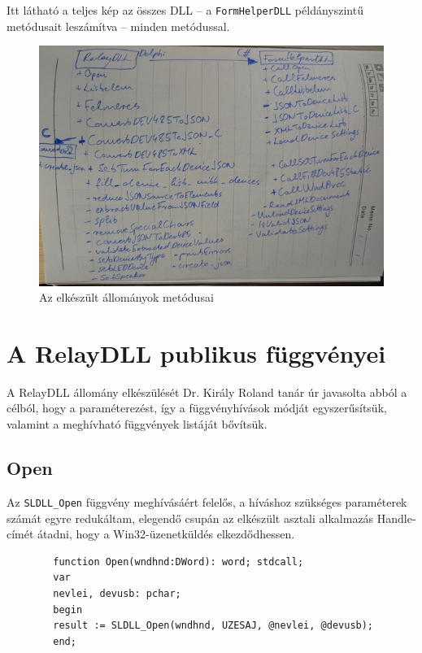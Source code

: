 \documentclass[tocnopagenum]{thesis-ekf}
\begin{document}
	Itt látható a teljes kép az összes DLL -- a \verb*|FormHelperDLL| példányszintű metódusait leszámítva -- minden metódussal.
	\begin{figure}[H]
	\centering
	\hspace*{-0.5in}
	\includegraphics[scale=0.7]{images/fuggvenyek_kezi.jpg}
	\caption{Az elkészült állományok metódusai}
	\label{fig:fuggvenyek_kezi}
	\end{figure}
	\section{A RelayDLL publikus függvényei}
	A RelayDLL állomány elkészülését Dr. Király Roland tanár úr javasolta abból a célból, hogy a paraméterezést, így a függvényhívások módját egyszerűsítsük, valamint a meghívható függvények listáját bővítsük.
	\subsection{Open} Az \verb*|SLDLL_Open| függvény meghívásáért felelős, a híváshoz szükséges paraméterek számát egyre redukáltam, elegendő csupán az elkészült asztali alkalmazás Handle-címét átadni, hogy a Win32-üzenetküldés elkezdődhessen.
	
	\begin{verbatim}
		function Open(wndhnd:DWord): word; stdcall;
		var
		nevlei, devusb: pchar;
		begin
		result := SLDLL_Open(wndhnd, UZESAJ, @nevlei, @devusb); 
		end;
	\end{verbatim}
\end{document}
